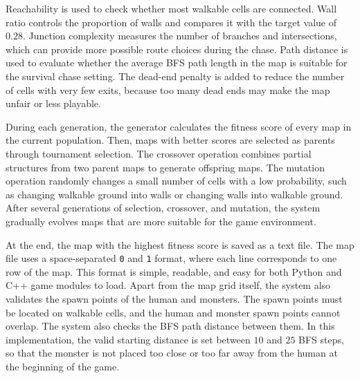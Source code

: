 Reachability is used to check whether most walkable cells are connected. Wall ratio controls the proportion of walls and compares it with the target value of $0.28$. Junction complexity measures the number of branches and intersections, which can provide more possible route choices during the chase. Path distance is used to evaluate whether the average BFS path length in the map is suitable for the survival chase setting. The dead-end penalty is added to reduce the number of cells with very few exits, because too many dead ends may make the map unfair or less playable.

During each generation, the generator calculates the fitness score of every map in the current population. Then, maps with better scores are selected as parents through tournament selection. The crossover operation combines partial structures from two parent maps to generate offspring maps. The mutation operation randomly changes a small number of cells with a low probability, such as changing walkable ground into walls or changing walls into walkable ground. After several generations of selection, crossover, and mutation, the system gradually evolves maps that are more suitable for the game environment.

At the end, the map with the highest fitness score is saved as a text file. The map file uses a space-separated \texttt{0} and \texttt{1} format, where each line corresponds to one row of the map. This format is simple, readable, and easy for both Python and C++ game modules to load. Apart from the map grid itself, the system also validates the spawn points of the human and monsters. The spawn points must be located on walkable cells, and the human and monster spawn points cannot overlap. The system also checks the BFS path distance between them. In this implementation, the valid starting distance is set between $10$ and $25$ BFS steps, so that the monster is not placed too close or too far away from the human at the beginning of the game.